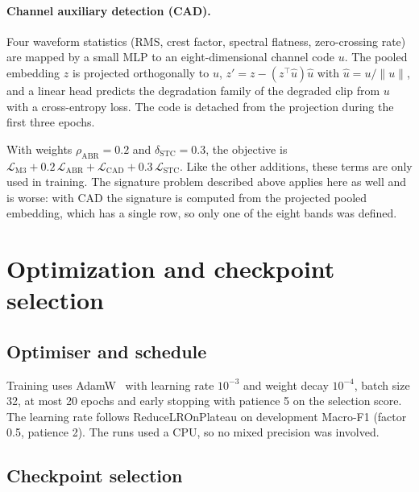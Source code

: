 \documentclass[12pt,a4paper]{report}
\begin{document}
\paragraph{Channel auxiliary detection (CAD).} Four waveform statistics (RMS, crest factor, spectral flatness, zero-crossing rate) are mapped by a small MLP to an eight-dimensional channel code $u$. The pooled embedding $z$ is projected orthogonally to $u$, $z'=z-(z^\top\hat u)\hat u$ with $\hat u=u/\lVert u\rVert$, and a linear head predicts the degradation family of the degraded clip from $u$ with a cross-entropy loss. The code is detached from the projection during the first three epochs.

With weights $\rho_{\mathrm{ABR}}=0.2$ and $\delta_{\mathrm{STC}}=0.3$, the objective is $\mathcal{L}_{\mathrm{M3}}+0.2\,\mathcal{L}_{\mathrm{ABR}}+\mathcal{L}_{\mathrm{CAD}}+0.3\,\mathcal{L}_{\mathrm{STC}}$. Like the other additions, these terms are only used in training. The signature problem described above applies here as well and is worse: with CAD the signature is computed from the projected pooled embedding, which has a single row, so only one of the eight bands was defined.

\section{Optimization and checkpoint selection}
\label{sec:optimization}

\subsection{Optimiser and schedule}

Training uses AdamW~\cite{loshchilov2019adamw} with learning rate $10^{-3}$ and weight decay $10^{-4}$, batch size 32, at most 20 epochs and early stopping with patience 5 on the selection score. The learning rate follows ReduceLROnPlateau on development Macro-F1 (factor 0.5, patience 2). The runs used a CPU, so no mixed precision was involved.

\subsection{Checkpoint selection}
\label{sec:selection}
\end{document}
